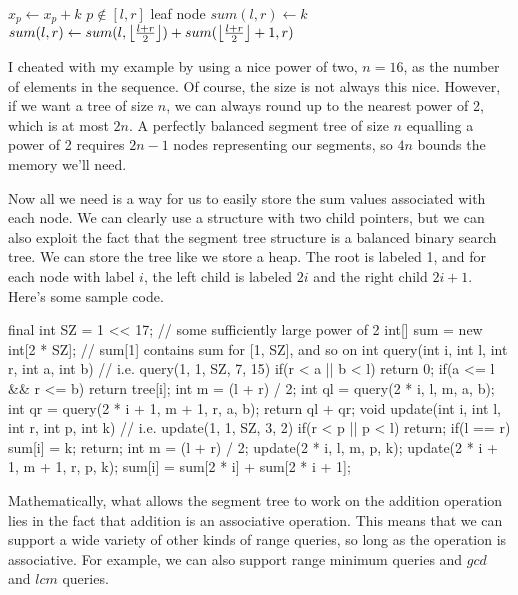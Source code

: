 \noindent \begin{minipage}{\textwidth}
\begin{algorithmic}
	\Comment $x_p \gets x_p + k$
		\Comment $p \not\in [l,r]$
		\State \Return
	\EndIf
		\Comment leaf node
		\State $sum(l,r) \gets k$
		\State \Return
	\EndIf
	\State {}
	\State {}
	\State $sum(l,r) \gets sum(l,\left\lfloor \frac{l+r}{2} \right\rfloor) + sum(\left\lfloor \frac{l+r}{2} \right\rfloor+1,r)$
\EndFunction
\end{algorithmic}
\end{minipage}

I cheated with my example by using a nice power of two, $n=16$, as the number of elements in the sequence. Of course, the size is not always this nice. However, if we want a tree of size $n$, we can always round up to the nearest power of 2, which is at most $2n$. A perfectly balanced segment tree of size $n$ equalling a power of 2 requires $2n-1$ nodes representing our segments, so $4n$ bounds the memory we'll need.

Now all we need is a way for us to easily store the sum values associated with each node. We can clearly use a structure with two child pointers, but we can also exploit the fact that the segment tree structure is a balanced binary search tree. We can store the tree like we store a heap. The root is labeled 1, and for each node with label $i$, the left child is labeled $2i$ and the right child $2i + 1$. Here's some sample code.

\begin{mylstlisting}
final int SZ = 1 << 17; // some sufficiently large power of 2
int[] sum = new int[2 * SZ]; // sum[1] contains sum for [1, SZ], and so on
int query(int i, int l, int r, int a, int b) {
	// i.e. query(1, 1, SZ, 7, 15)
	if(r < a || b < l) return 0;
	if(a <= l && r <= b) return tree[i];
	int m = (l + r) / 2;
	int ql = query(2 * i, l, m, a, b);
	int qr = query(2 * i + 1, m + 1, r, a, b);
	return ql + qr;
}
void update(int i, int l, int r, int p, int k) {
	// i.e. update(1, 1, SZ, 3, 2)
	if(r < p || p < l) return;
	if(l == r){
		sum[i] = k;
		return;
	}
	int m = (l + r) / 2;
	update(2 * i, l, m, p, k);
	update(2 * i + 1, m + 1, r, p, k);
	sum[i] = sum[2 * i] + sum[2 * i + 1];
}
\end{mylstlisting}

Mathematically, what allows the segment tree to work on the addition operation lies in the fact that addition is an associative operation. This means that we can support a wide variety of other kinds of range queries, so long as the operation is associative. For example, we can also support range minimum queries and $gcd$ and $lcm$ queries.

